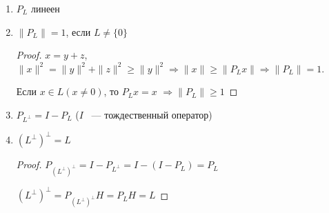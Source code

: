     \begin{properties}
    \begin{enumerate}
    \item $P_L$ линеен
    
    \item $\|P_L\| = 1$, если $L \neq \{0\}$
    
    \begin{proof}
    $x = y + z$, $\|x\|^2 = \|y\|^2 + \|z\|^2 \ge \|y\|^2 \Rightarrow \|x\| \ge \|P_Lx\| \Rightarrow \|P_L\| = 1$.
    
    Если $x \in L (x\neq 0)$, то $P_Lx = x$ $\Rightarrow \|P_L\|\ge 1$
    \end{proof}
    
    \item $P_{L^\perp} = I - P_L$ ($I$ ~--- тождественный оператор)
    
    \item $(L^{\perp})^\perp = L$
    
    \begin{proof}
    $P_{(L^{\perp})^\perp} = I - P_{L^\perp} = I - (I - P_L) = P_L$
    
    $(L^{\perp})^\perp = P_{(L^{\perp})^\perp}H = P_L H = L$
    \end{proof}
    \end{enumerate}
    \end{properties}

\newpage

